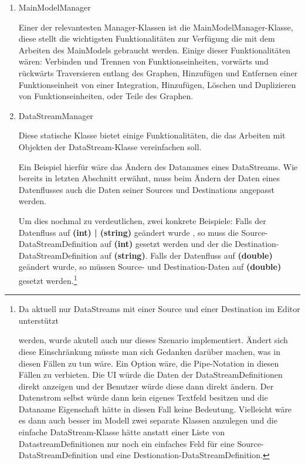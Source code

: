 \begin{enumerate}
	\item MainModelManager
	
	Einer der relevantesten Manager-Klassen ist die MainModelManager-Klasse,
	diese stellt die wichtigsten Funktionalitäten zur Verfügung die mit dem
	Arbeiten des MainModels gebraucht werden. Einige dieser Funktionalitäten
	wären: Verbinden und Trennen von Funktionseinheiten, vorwärts und rückwärts
	Traversieren entlang des Graphen, Hinzufügen und Entfernen einer
	Funktionseinheit von einer Integration, Hinzufügen, Löschen und Duplizieren
	von Funktionseinheiten, oder Teile des Graphen.
	
	\item DataStreamManager
	
	Diese statische Klasse bietet einige Funktionalitäten, die das Arbeiten mit
	Objekten der DataStream-Klasse vereinfachen soll.
	
	Ein Beispiel hierfür wäre das Ändern des Datanames eines DataStreams. 
	Wie bereits in letzten Abschnitt erwähnt, muss beim Ändern der Daten
	eines Datenflusses auch die Daten seiner Sources und Destinations
	angepasst werden. 
	
	Um dies nochmal zu verdeutlichen, zwei konkrete Beispiele:
	Falls der Datenfluss auf \textbf{(int) | (string) } geändert wurde
	, so muss die Source-DataStreamDefinition auf \textbf{(int)} gesetzt werden und der
	die Destination-DataStreamDefinition auf \textbf{(string)}. 
	Falls der Datenfluss auf \textbf{(double)} geändert wurde, so müssen Source-
	und Destination-Daten auf  \textbf{(double)}  gesetzt werden.\footnote{	Da aktuell nur DataStreams mit einer Source und einer Destination im Editor unterstützt
		
		werden, wurde akutell auch nur dieses Szenario implementiert. Ändert sich
		diese Einschränkung müsste man sich Gedanken darüber machen, was in diesen
		Fällen zu tun wäre. Ein Option wäre, die Pipe-Notation in diesen Fällen zu
		verbieten. Die UI würde die Daten der DataStreamDefinitionen direkt
		anzeigen und der Benutzer würde diese dann direkt ändern. Der Datenstrom
		selbst würde dann kein eigenes Textfeld besitzen und die Dataname
		Eigenschaft hätte in diesen Fall keine Bedeutung. 
		Vielleicht wäre es dann auch besser im Modell zwei separate Klassen
		anzulegen und die
		einfache DataStream-Klasse hätte anstatt einer Liste von DatastreamDefinitionen nur noch ein einfaches Feld
		für eine Source-DataStreamDefinition und eine Destionation-DataStreamDefinition.}
	

\end{enumerate}
